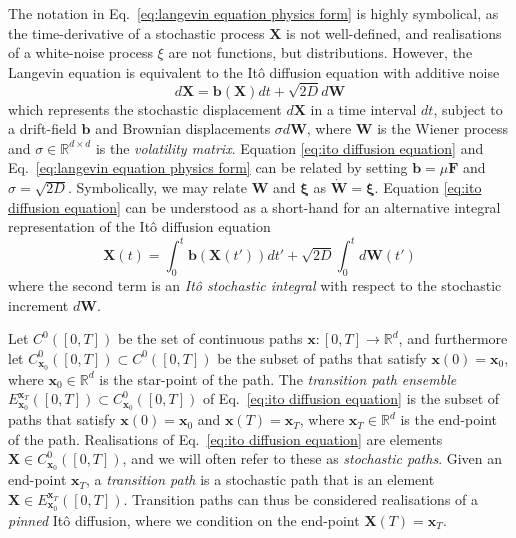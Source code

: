 The notation in Eq.~\ref{eq:langevin equation physics form} is highly symbolical, as the time-derivative of a stochastic process $\mathbf{X}$ is not well-defined, and realisations of a white-noise process $\xi$ are not functions, but distributions. However, the Langevin equation is equivalent to the It\^{o} diffusion equation with additive noise
\begin{equation} \label{eq:ito diffusion equation}
d \mathbf{X} = \mathbf{b}(\mathbf{X}) dt + \sqrt{2D} d \mathbf{W}
\end{equation}
which represents the stochastic displacement $d\mathbf{X}$ in a time
interval $dt$, subject to a drift-field $\mathbf{b}$ and Brownian displacements $\sigma d\mathbf{W}$, where $\mathbf{W}$ is the Wiener process and $\sigma \in \mathbb{R}^{d \times d}$ is the \textit{volatility matrix}. Equation \ref{eq:ito diffusion equation} and Eq.~\ref{eq:langevin equation physics form} can be related by setting $\mathbf{b} = \mu \mathbf{F}$ and $\sigma = \sqrt{2 D}$. Symbolically, we may relate $\mathbf{W}$ and $\boldsymbol{\xi}$ as $\dot{\mathbf{W}} = \boldsymbol{\xi}$. Equation \ref{eq:ito diffusion equation} can be understood as a short-hand for an alternative integral representation of the It\^{o} diffusion equation  
\begin{equation} \label{eq:integral ito equation}
\mathbf{X}(t) = \int_0^t \mathbf{b}(\mathbf{X}(t')) dt' + \sqrt{2D} \int_0^{t} d \mathbf{W}(t')
\end{equation}
where the second term is an \textit{It\^{o} stochastic integral} \citep{oksendalStochasticDifferentialEquations2003, shreveStochasticCalculusFinance2005} with respect to the stochastic increment $d \mathbf{W}$.

Let $C^0([0,T])$ be the set of continuous paths $\mathbf{x} : [0, T] \to \mathbb{R}^d$, and furthermore let $C_{\mathbf{x}_0}^0([0,T]) \subset C^0([0,T])$ be the subset of paths that satisfy $\mathbf{x}(0) = \mathbf{x}_0$, where $\mathbf{x}_0 \in \mathbb{R}^d$ is the star-point of the path. The \textit{transition path ensemble} $E_{\mathbf{x}_0}^{\mathbf{x}_T}([0,T]) \subset C_{\mathbf{x}_0}^0([0,T])$ of Eq.~\ref{eq:ito diffusion equation} is the subset of paths that satisfy $\mathbf{x}(0) = \mathbf{x}_0$ and $\mathbf{x}(T) = \mathbf{x}_T$, where $\mathbf{x}_T \in \mathbb{R}^d$ is the end-point of the path. Realisations of Eq.~\ref{eq:ito diffusion equation} are elements $\mathbf{X} \in C_{\mathbf{x}_0}^0([0,T])$, and we will often refer to these as \textit{stochastic paths}. Given an end-point $\mathbf{x}_T$, a \textit{transition path} is a stochastic path that is an element $\mathbf{X} \in E_{\mathbf{x}_0}^{\mathbf{x}_T}([0,T])$. Transition paths can thus be considered realisations of a \textit{pinned} It\^{o} diffusion, where we condition on the end-point $\mathbf{X}(T) = \mathbf{x}_T$.


